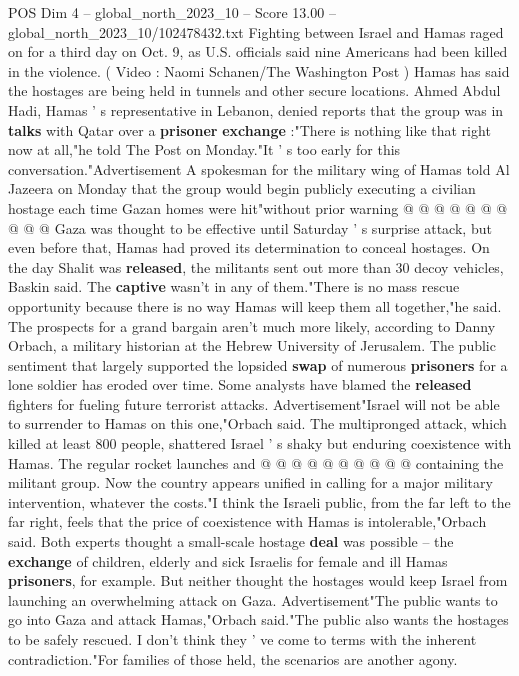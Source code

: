 \begin{textsample}{POS Dim 4 – global\_north\_2023\_10 – Score 13.00 – global\_north\_2023\_10/102478432.txt}
Fighting between Israel and Hamas raged on for a third day on Oct. 9, as U.S. officials said nine Americans had been killed in the violence. ( Video : Naomi Schanen/The Washington Post ) Hamas has said the hostages are being held in tunnels and other secure locations.
Ahmed Abdul Hadi, Hamas ' s representative in Lebanon, denied reports that the group was in \textbf{talks} with Qatar over a \textbf{prisoner} \textbf{exchange} :"There is nothing like that right now at all,"he told The Post on Monday."It ' s too early for this conversation."Advertisement A spokesman for the military wing of Hamas told Al Jazeera on Monday that the group would begin publicly executing a civilian hostage each time Gazan homes were hit"without prior warning @ @ @ @ @ @ @ @ @ @ Gaza was thought to be effective until Saturday ' s surprise attack, but even before that, Hamas had proved its determination to conceal hostages.
On the day Shalit was \textbf{released}, the militants sent out more than 30 decoy vehicles, Baskin said.
The \textbf{captive} wasn't in any of them."There is no mass rescue opportunity because there is no way Hamas will keep them all together,"he said.
The prospects for a grand bargain aren't much more likely, according to Danny Orbach, a military historian at the Hebrew University of Jerusalem.
The public sentiment that largely supported the lopsided \textbf{swap} of numerous \textbf{prisoners} for a lone soldier has eroded over time.
Some analysts have blamed the \textbf{released} fighters for fueling future terrorist attacks.
Advertisement"Israel will not be able to surrender to Hamas on this one,"Orbach said.
The multipronged attack, which killed at least 800 people, shattered Israel ' s shaky but enduring coexistence with Hamas.
The regular rocket launches and @ @ @ @ @ @ @ @ @ @ containing the militant group.
Now the country appears unified in calling for a major military intervention, whatever the costs."I think the Israeli public, from the far left to the far right, feels that the price of coexistence with Hamas is intolerable,"Orbach said.
Both experts thought a small-scale hostage \textbf{deal} was possible -- the \textbf{exchange} of children, elderly and sick Israelis for female and ill Hamas \textbf{prisoners}, for example.
But neither thought the hostages would keep Israel from launching an overwhelming attack on Gaza.
Advertisement"The public wants to go into Gaza and attack Hamas,"Orbach said."The public also wants the hostages to be safely rescued.
I don't think they ' ve come to terms with the inherent contradiction."For families of those held, the scenarios are another agony.

\end{textsample}
